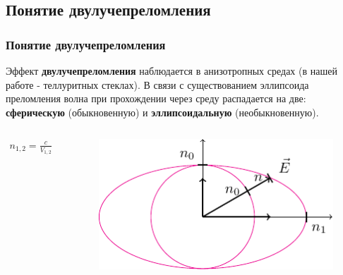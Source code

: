 \documentclass[10pt,pdf,hyperref={unicode}, dvipsnames]{beamer}
\begin{document}
\subsection{Понятие двулучепреломления}
\begin{frame}[t]
	\frametitle{Понятие двулучепреломления}
	Эффект \textbf{двулучепреломления} наблюдается в анизотропных средах (в нашей работе - теллуритных стеклах). 
	В связи с существованием эллипсоида преломления волна при прохождении через среду распадается на две: \textbf{сферическую} (обыкновенную) и \textbf{эллипсоидальную} (необыкновенную). 
	
	
	\begin{columns}
		\begin{column}{0.5\textwidth}
			
			\begin{gather*}
				n_{1,2}=\frac{c}{V_{1,2}}
			\end{gather*}
			
		\end{column}
		\begin{column}{0.5\textwidth}
			\begin{figure}[tb]
				\centering
				\includegraphics[width=\textwidth]{img/dvp2}
			\end{figure}
		\end{column}
	\end{columns}
\end{frame}
\end{document}
